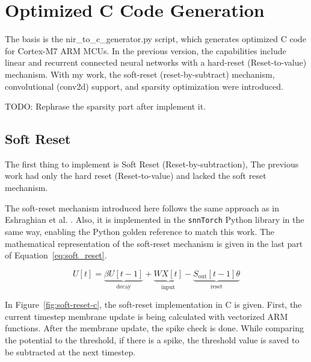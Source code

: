 \documentclass[11pt,a4paper]{article}
\begin{document}
\section{Optimized C Code Generation}

The basis is the nir\_to\_c\_generator.py script, which generates optimized C code for Cortex-M7 ARM MCUs. 
In the previous version, the capabilities include linear and recurrent connected neural networks with a hard-reset (Reset-to-value) mechanism. 
With my work, the soft-reset (reset-by-subtract) mechanism, convolutional (conv2d) support, and sparsity optimization were introduced.

TODO: Rephrase the sparsity part after implement it.


\subsection{Soft Reset}
The first thing to implement is Soft Reset (Reset-by-subtraction), 
The previous work had only the hard reset (Reset-to-value) and lacked the soft reset mechanism.

The soft-reset mechanism introduced here follows the same approach as in Eshraghian et al. \cite{eshraghian2023snntorch}.
Also, it is implemented in the \texttt{snnTorch} Python library in the same way, enabling the Python golden reference to match this work. 
The mathematical representation of the soft-reset mechanism is given in the last part of Equation~\ref{eq:soft_reset}.

\begin{equation}\label{eq:soft_reset}
U[t] = \underbrace{\beta U[t - 1]}_{\text{decay}} + \underbrace{W X[t]}_{\text{input}} - \underbrace{S_{\text{out}}[t - 1]\theta}_{\text{reset}}
\end{equation}


In Figure~\ref{fig:soft-reset-c}, the soft-reset implementation in C is given.
First, the current timestep membrane update is being calculated with vectorized ARM functions. 
After the membrane update, the spike check is done. 
While comparing the potential to the threshold, if there is a spike, 
the threshold value is saved to be subtracted at the next timestep. 
\end{document}
